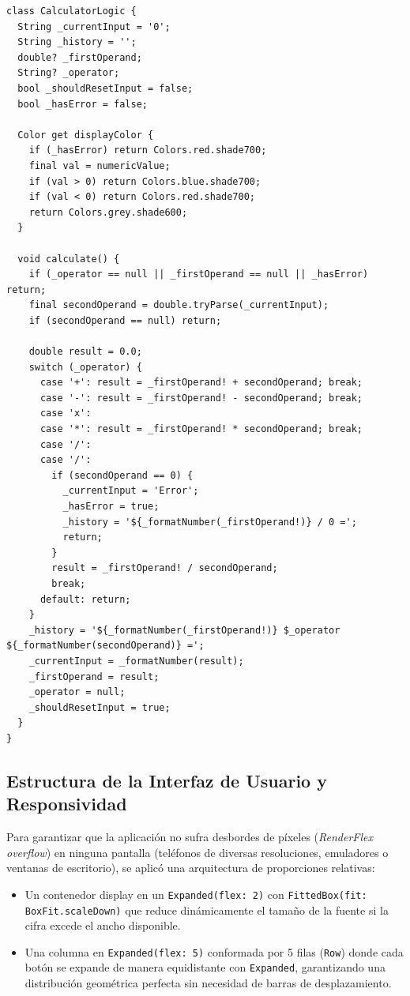 \documentclass[12pt,a4paper]{article}
\begin{document}
\begin{lstlisting}[caption={Fragmento de la lógica de evaluación y reglas de color (lib/models/calculator\_logic.dart)}]
class CalculatorLogic {
  String _currentInput = '0';
  String _history = '';
  double? _firstOperand;
  String? _operator;
  bool _shouldResetInput = false;
  bool _hasError = false;

  Color get displayColor {
    if (_hasError) return Colors.red.shade700;
    final val = numericValue;
    if (val > 0) return Colors.blue.shade700;
    if (val < 0) return Colors.red.shade700;
    return Colors.grey.shade600;
  }

  void calculate() {
    if (_operator == null || _firstOperand == null || _hasError) return;
    final secondOperand = double.tryParse(_currentInput);
    if (secondOperand == null) return;

    double result = 0.0;
    switch (_operator) {
      case '+': result = _firstOperand! + secondOperand; break;
      case '-': result = _firstOperand! - secondOperand; break;
      case 'x':
      case '*': result = _firstOperand! * secondOperand; break;
      case '/':
      case '/':
        if (secondOperand == 0) {
          _currentInput = 'Error';
          _hasError = true;
          _history = '${_formatNumber(_firstOperand!)} / 0 =';
          return;
        }
        result = _firstOperand! / secondOperand;
        break;
      default: return;
    }
    _history = '${_formatNumber(_firstOperand!)} $_operator ${_formatNumber(secondOperand)} =';
    _currentInput = _formatNumber(result);
    _firstOperand = result;
    _operator = null;
    _shouldResetInput = true;
  }
}
\end{lstlisting}

\subsection{Estructura de la Interfaz de Usuario y Responsividad}
Para garantizar que la aplicación no sufra desbordes de píxeles (\textit{RenderFlex overflow}) en ninguna pantalla (teléfonos de diversas resoluciones, emuladores o ventanas de escritorio), se aplicó una arquitectura de proporciones relativas:
\begin{itemize}
    \item Un contenedor display en un \texttt{Expanded(flex: 2)} con \texttt{FittedBox(fit: BoxFit.scaleDown)} que reduce dinámicamente el tamaño de la fuente si la cifra excede el ancho disponible.
    \item Una columna en \texttt{Expanded(flex: 5)} conformada por 5 filas (\texttt{Row}) donde cada botón se expande de manera equidistante con \texttt{Expanded}, garantizando una distribución geométrica perfecta sin necesidad de barras de desplazamiento.
\end{itemize}
\end{document}
